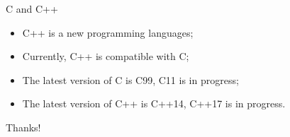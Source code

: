 \documentclass[UTF8]{beamer}
\begin{document}
\begin{frame}[t]{C and C++}
\begin{itemize}
  \item C++ is a new programming languages;
  \item Currently, C++ is compatible with C;
  \item The latest version of C is C99, C11 is in progress;
  \item The latest version of C++ is C++14, C++17 is in progress.
\end{itemize}
\end{frame}

\begin{frame}
  \centerline{\Huge{Thanks!}}
\end{frame}
\end{document}
